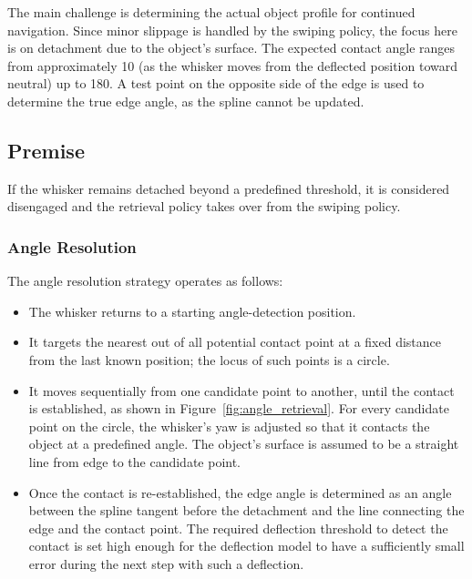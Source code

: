 The main challenge is determining the actual object profile for continued navigation.
Since minor slippage is handled by the swiping policy, the focus here is on detachment due to the object's surface.
The expected contact angle ranges from approximately 10\textdegree{} (as the whisker moves from the deflected position toward neutral) up to 180\textdegree.
A test point on the opposite side of the edge is used to determine the true edge angle, as the spline cannot be updated.

\subsection{Premise}
If the whisker remains detached beyond a predefined threshold, it is considered disengaged and the retrieval policy takes over from the swiping policy.

\subsubsection{Angle Resolution}
The angle resolution strategy operates as follows:
\begin{itemize}
    \item The whisker returns to a starting angle-detection position.
    \item It targets the nearest out of all potential contact point at a fixed distance from the last known position; the locus of such points is a circle.
    \item It moves sequentially from one candidate point to another, until the contact is established, as shown in Figure~\ref{fig:angle_retrieval}.
    For every candidate point on the circle, the whisker's yaw is adjusted so that it contacts the object at a predefined angle.
    The object's surface is assumed to be a straight line from edge to the candidate point.
    \item Once the contact is re-established, the edge angle is determined as an angle between the spline tangent before the detachment and the line connecting the edge and the contact point.
    The required deflection threshold to detect the contact is set high enough for the deflection model to have a sufficiently small error during the next step with such a deflection.
\end{itemize}


